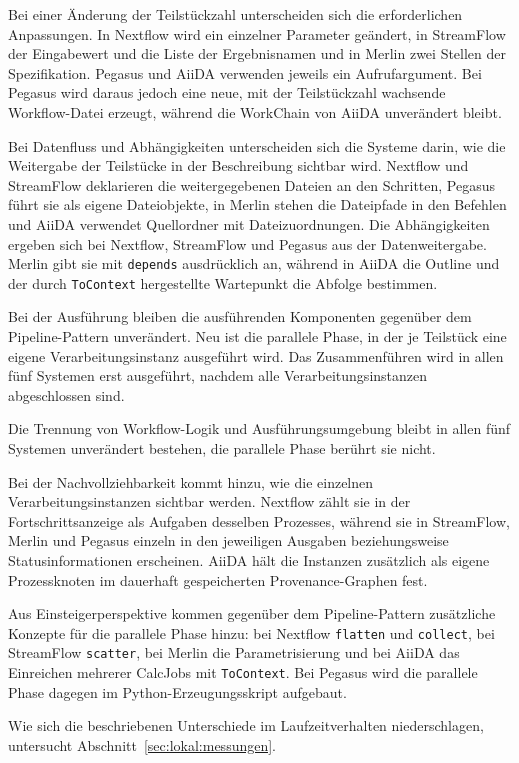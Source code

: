 Bei einer Änderung der Teilstückzahl unterscheiden sich die
erforderlichen Anpassungen. In Nextflow wird ein einzelner Parameter
geändert, in StreamFlow der Eingabewert und die Liste der
Ergebnisnamen und in Merlin zwei Stellen der Spezifikation. Pegasus
und AiiDA verwenden jeweils ein Aufrufargument. Bei Pegasus wird
daraus jedoch eine neue, mit der Teilstückzahl wachsende
Workflow-Datei erzeugt, während die WorkChain von AiiDA unverändert
bleibt.

Bei Datenfluss und Abhängigkeiten unterscheiden sich die Systeme
darin, wie die Weitergabe der Teilstücke in der Beschreibung
sichtbar wird. Nextflow und StreamFlow deklarieren die
weitergegebenen Dateien an den Schritten, Pegasus führt sie als
eigene Dateiobjekte, in Merlin stehen die Dateipfade in den
Befehlen und AiiDA verwendet Quellordner mit Dateizuordnungen. Die
Abhängigkeiten ergeben sich bei Nextflow, StreamFlow und Pegasus aus
der Datenweitergabe. Merlin gibt sie mit \texttt{depends}
ausdrücklich an, während in AiiDA die Outline und der durch
\texttt{ToContext} hergestellte Wartepunkt die Abfolge bestimmen.

Bei der Ausführung bleiben die ausführenden Komponenten gegenüber
dem Pipeline-Pattern unverändert. Neu ist die parallele Phase, in
der je Teilstück eine eigene Verarbeitungsinstanz ausgeführt wird.
Das Zusammenführen wird in allen fünf Systemen erst ausgeführt,
nachdem alle Verarbeitungsinstanzen abgeschlossen sind.

Die Trennung von Workflow-Logik und Ausführungsumgebung bleibt in
allen fünf Systemen unverändert bestehen, die parallele Phase
berührt sie nicht.

Bei der Nachvollziehbarkeit kommt hinzu, wie die einzelnen
Verarbeitungsinstanzen sichtbar werden. Nextflow zählt sie in der
Fortschrittsanzeige als Aufgaben desselben Prozesses, während sie in
StreamFlow, Merlin und Pegasus einzeln in den jeweiligen Ausgaben
beziehungsweise Statusinformationen erscheinen. AiiDA hält die
Instanzen zusätzlich als eigene Prozessknoten im dauerhaft
gespeicherten Provenance-Graphen fest.

Aus Einsteigerperspektive kommen gegenüber dem Pipeline-Pattern
zusätzliche Konzepte für die parallele Phase hinzu: bei Nextflow
\texttt{flatten} und \texttt{collect}, bei StreamFlow
\texttt{scatter}, bei Merlin die Parametrisierung und bei AiiDA das
Einreichen mehrerer CalcJobs mit \texttt{ToContext}. Bei Pegasus
wird die parallele Phase dagegen im Python-Erzeugungsskript
aufgebaut.

Wie sich die beschriebenen Unterschiede im
Laufzeitverhalten niederschlagen, untersucht
Abschnitt~\ref{sec:lokal:messungen}.

